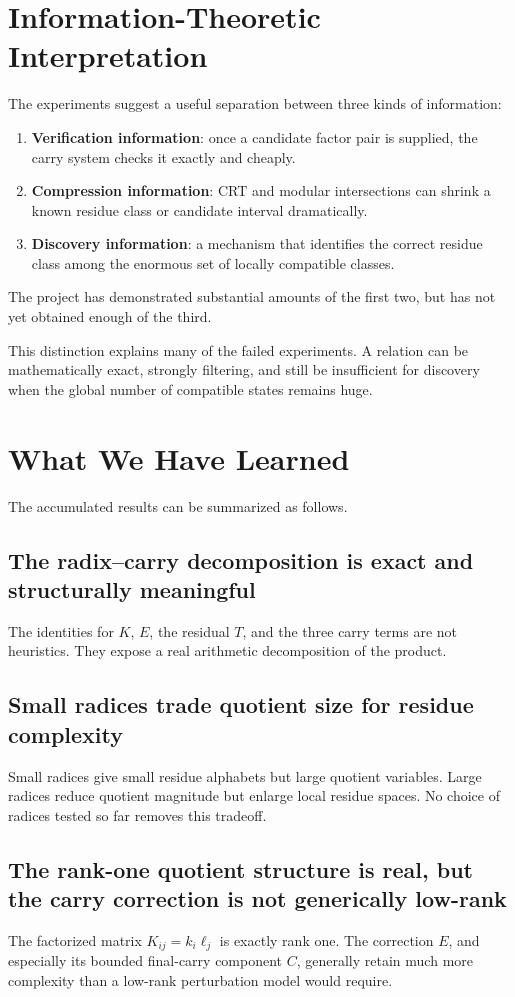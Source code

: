 \documentclass[11pt,a4paper]{article}
\begin{document}
\section{Information-Theoretic Interpretation}
The experiments suggest a useful separation between three kinds of information:
\begin{enumerate}[label=(\roman*)]
    \item \textbf{Verification information}: once a candidate factor pair is supplied, the carry system checks it exactly and cheaply.
    \item \textbf{Compression information}: CRT and modular intersections can shrink a known residue class or candidate interval dramatically.
    \item \textbf{Discovery information}: a mechanism that identifies the correct residue class among the enormous set of locally compatible classes.
\end{enumerate}
The project has demonstrated substantial amounts of the first two, but has not yet obtained enough of the third.

This distinction explains many of the failed experiments. A relation can be mathematically exact, strongly filtering, and still be insufficient for discovery when the global number of compatible states remains huge.

\section{What We Have Learned}
The accumulated results can be summarized as follows.

\subsection{The radix--carry decomposition is exact and structurally meaningful}
The identities for \(K\), \(E\), the residual \(T\), and the three carry terms are not heuristics. They expose a real arithmetic decomposition of the product.

\subsection{Small radices trade quotient size for residue complexity}
Small radices give small residue alphabets but large quotient variables. Large radices reduce quotient magnitude but enlarge local residue spaces. No choice of radices tested so far removes this tradeoff.

\subsection{The rank-one quotient structure is real, but the carry correction is not generically low-rank}
The factorized matrix \(K_{ij}=k_i\ell_j\) is exactly rank one. The correction \(E\), and especially its bounded final-carry component \(C\), generally retain much more complexity than a low-rank perturbation model would require.
\end{document}

